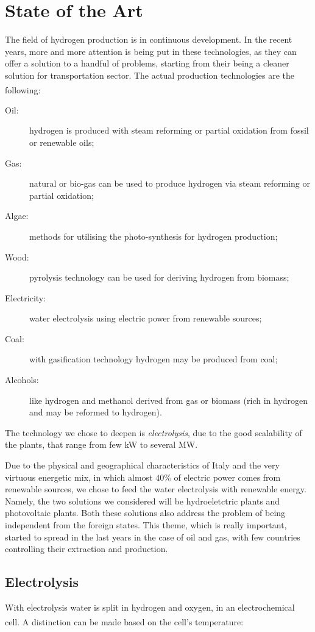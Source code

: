 \section{State of the Art}
The field of hydrogen production is in continuous development. In the recent years, more and more attention is being put in these technologies, as they can offer a solution to a handful of problems, starting from their being a cleaner solution for transportation sector. The actual production technologies are the following\textsuperscript{\cite{guanda20211}}:

\begin{description}
    \item[Oil:] hydrogen is produced with steam reforming or partial oxidation from fossil or renewable oils;
    \item[Gas:] natural or bio-gas can be used to produce hydrogen via steam reforming or partial oxidation;
    \item[Algae:] methods for utilising the photo-synthesis for hydrogen production;
    \item[Wood:] pyrolysis technology can be used for deriving hydrogen from biomass;
    \item[Electricity:] water electrolysis using electric power from renewable sources;
    \item[Coal:] with gasification technology hydrogen may be produced from coal;
    \item[Alcohols:] like hydrogen and methanol derived from gas or biomass (rich in hydrogen and may be reformed to hydrogen).
\end{description}

The technology we chose to deepen is \textit{electrolysis}, due to the good scalability of the plants, that range from few kW to several MW.

Due to the physical and geographical characteristics of Italy and the very virtuous energetic mix, in which almost $40\%$ of electric power comes from renewable sources, we chose to feed the water electrolysis with renewable energy. Namely, the two solutions we considered will be hydroeletctric plants and photovoltaic plants. Both these solutions also address the problem of being independent from the foreign states. This theme, which is really important, started to spread in the last years in the case of oil and gas, with few countries controlling their extraction and production.

\subsection{Electrolysis}
With electrolysis water is split in hydrogen and oxygen, in an electrochemical cell. A distinction can be made based on the cell's temperature\textsuperscript{\cite{guanda20211}}:

